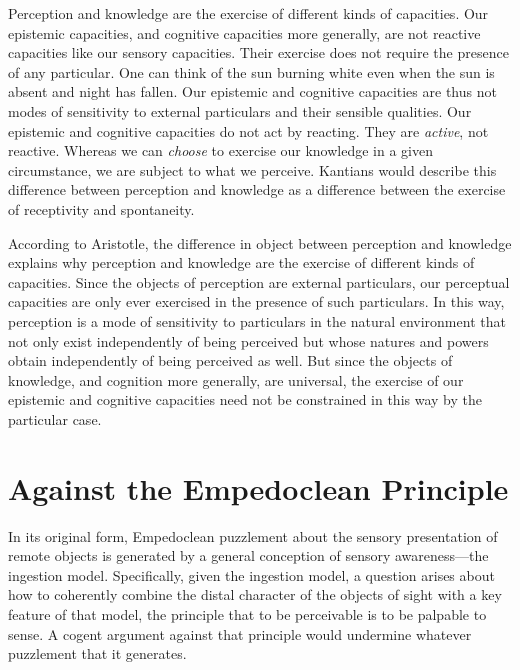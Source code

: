 Perception and knowledge are the exercise of different kinds of capacities. Our epistemic capacities, and cognitive capacities more generally, are not reactive capacities like our sensory capacities. Their exercise does not require the presence of any particular. One can think of the sun burning white even when the sun is absent and night has fallen. Our epistemic and cognitive capacities are thus not modes of sensitivity to external particulars and their sensible qualities. Our epistemic and cognitive capacities do not act by reacting. They are \emph{active}, not reactive. Whereas we can \emph{choose} to exercise our knowledge in a given circumstance, we are subject to what we perceive. Kantians would describe this difference between perception and knowledge as a difference between the exercise of receptivity and spontaneity.

According to Aristotle, the difference in object between perception and know\-ledge explains why perception and knowledge are the exercise of different kinds of capacities. Since the objects of perception are external particulars, our perceptual capacities are only ever exercised in the presence of such particulars. In this way, perception is a mode of sensitivity to particulars in the natural environment that not only exist independently of being perceived but whose natures and powers obtain independently of being perceived as well. But since the objects of knowledge, and cognition more generally, are universal, the exercise of our epistemic and cognitive capacities need not be constrained in this way by the particular case. 


\section{Against the Empedoclean Principle} %
\label{sec:against_the_empedoclean_principle}

In its original form, Empedoclean puzzlement about the sensory presentation of remote objects is generated by a general conception of sensory awareness---the ingestion model. Specifically, given the ingestion model, a question arises about how to coherently combine the distal character of the objects of sight with a key feature of that model, the principle that to be perceivable is to be palpable to sense. A cogent argument against that principle would undermine whatever puzzlement that it generates. 

